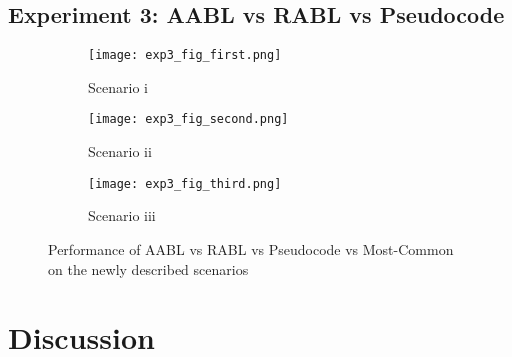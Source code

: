 \documentclass{article}
\begin{document}
\subsection{Experiment 3: AABL vs RABL vs Pseudocode}
\begin{figure}[H]
    \centering
    \begin{subfigure}[b]{0.45\textwidth}
        \texttt{[image: exp3\_fig\_first.png]}
        \caption{Scenario i}
    \end{subfigure}
    \begin{subfigure}[b]{0.45\textwidth}
        \texttt{[image: exp3\_fig\_second.png]}
        \caption{Scenario ii}
    \end{subfigure}
    \begin{subfigure}[b]{0.45\textwidth}
        \texttt{[image: exp3\_fig\_third.png]}
        \caption{Scenario iii}
    \end{subfigure}
    \caption{Performance of AABL vs RABL vs Pseudocode vs Most-Common on the newly described scenarios}
    \label{fig:exp3-.png}
\end{figure}

\newpage
\section{Discussion}
\label{discussion}
\end{document}
